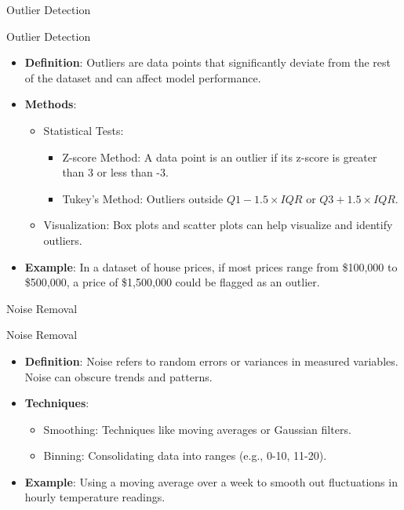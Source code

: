 \documentclass[aspectratio=169]{beamer}
\begin{document}
\begin{frame}[fragile]{Outlier Detection}
  \begin{block}{Outlier Detection}
    \begin{itemize}
      \item \textbf{Definition}: Outliers are data points that significantly deviate from the rest of the dataset and can affect model performance.
      \item \textbf{Methods}:
        \begin{itemize}
          \item Statistical Tests:
            \begin{itemize}
              \item Z-score Method: A data point is an outlier if its z-score is greater than 3 or less than -3.
              \item Tukey's Method: Outliers outside $Q1 - 1.5 \times IQR$ or $Q3 + 1.5 \times IQR$.
            \end{itemize}
          \item Visualization: Box plots and scatter plots can help visualize and identify outliers.
        \end{itemize}
      \item \textbf{Example}: In a dataset of house prices, if most prices range from \$100,000 to \$500,000, a price of \$1,500,000 could be flagged as an outlier.
    \end{itemize}
  \end{block}
\end{frame}

\begin{frame}[fragile]{Noise Removal}
  \begin{block}{Noise Removal}
    \begin{itemize}
      \item \textbf{Definition}: Noise refers to random errors or variances in measured variables. Noise can obscure trends and patterns.
      \item \textbf{Techniques}:
        \begin{itemize}
          \item Smoothing: Techniques like moving averages or Gaussian filters.
          \item Binning: Consolidating data into ranges (e.g., 0-10, 11-20).
        \end{itemize}
      \item \textbf{Example}: Using a moving average over a week to smooth out fluctuations in hourly temperature readings.
    \end{itemize}
  \end{block}
\end{frame}
\end{document}
